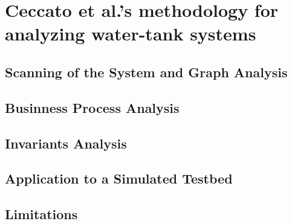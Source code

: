 \section{Ceccato et al.’s methodology for analyzing water-tank systems}
\label{sec:ceccato_metodology}

\subsection{Scanning of the System and Graph Analysis}
\label{subsec:ceccato_graphanalysis}

\subsection{Businness Process Analysis}
\label{subsec:ceccato_businessprocess}

\subsection{Invariants Analysis}
\label{subsec:ceccato_invariants}

\subsection{Application to a Simulated Testbed}
\label{subsec:ceccato_testbed}

\subsection{Limitations}
\label{subsec:ceccato_limitations}

\nolinenumbers
\vfill